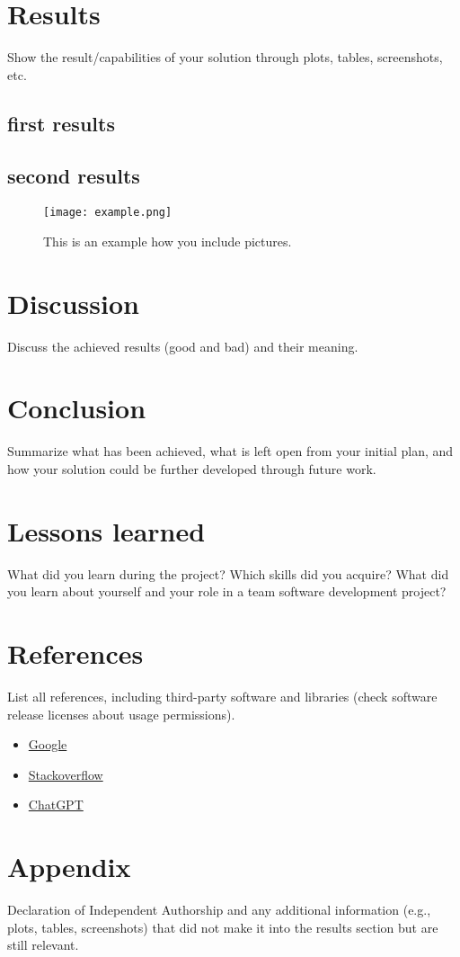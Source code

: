 \documentclass{article} %
\begin{document}
\section{Results}
Show the result/capabilities of your solution through plots, tables, screenshots, etc.
\subsection{first results}
\lipsum[1-2]
\subsection{second results}
\lipsum[1-1]
\begin{figure}[h]
    \centering
    \texttt{[image: example.png]}
    \caption{This is an example how you include pictures.}
    \label{fig:example}
\end{figure}

\section{Discussion}
Discuss the achieved results (good and bad) and their meaning.\\
\lipsum[1-2]
\clearpage

\section{Conclusion}
Summarize what has been achieved, what is left open from your initial plan, and
how your solution could be further developed through future work.\\
\lipsum[1-2]
\clearpage

\section{Lessons learned}
What did you learn during the project? Which skills did you acquire? What
did you learn about yourself and your role in a team software development project?\\
\lipsum[1-3]
\clearpage

\section{References}
List all references, including third-party software and libraries (check software
release licenses about usage permissions).
\begin{itemize}
    \item \href{https://www.google.com}{Google}
    \item \href{https://stackoverflow.com}{Stackoverflow}
    \item \href{https://chatgpt.com}{ChatGPT}
\end{itemize}
\lipsum[1-1]

\section{Appendix}
Declaration of Independent Authorship and any additional
information (e.g., plots, tables, screenshots) that did not make it into the results section but
are still relevant.\\
\lipsum[1-1]
\end{document}

